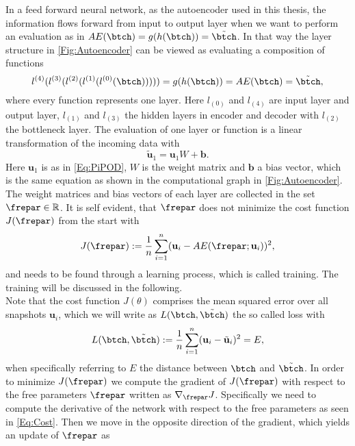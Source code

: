 In a feed forward neural network, as the autoencoder used in this thesis, the information flows forward from input to output layer when we want to perform an evaluation as in \(AE(\btch) = g(h(\btch)) =\tilde{\btch }\). In that way the layer structure in \cref{Fig:Autoencoder} can be viewed as evaluating a composition of functions
\begin{equation}
	l^{(4)}(l^{(3)}(l^{(2)}(l^{(1)}(l^{(0)}(\btch))))) = g(h(\btch)) = AE(\btch) = \tilde{\btch}\mathrm{,}
	\label{Eq:Composition}
\end{equation}
where every function represents one layer. Here \(l_{(0)}\) and \(l_{(4)}\) are input layer and output layer, \(l_{(1)}\) and \(l_{(3)}\) the hidden layers in encoder and decoder with \(l_{(2)}\) the bottleneck layer. The evaluation of one layer or function is a linear transformation of the incoming data with
\begin{equation}
\tilde{\mathbf{u}}_1 = \mathbf{u}_1W + \mathbf{b}\mathrm{.} \label{Eq. Linear Transformation}
\end{equation}
Here \(\mathbf{u}_1\) is as in \cref{Eq:PiPOD}, \(W\) is the weight matrix and \(\mathbf{b}\) a bias vector, which is the same equation as shown in the computational graph in \cref{Fig:Autoencoder}. The weight matrices and bias vectors of each layer are collected in the set \(\frepar \in \mathbb{R}\).  It is self evident, that \(\frepar\) does not minimize the cost function \(J(\frepar)\) from the start with
\begin{equation}
	J(\frepar) := \frac{1}{n}\sum_{i=1}^n (\mathbf{u}_i - AE(\frepar;\mathbf{u}_i))^2\mathrm{,}
	\label{Eq:Cost}
\end{equation}
and needs to be found through a learning process, which is called training. The training will be discussed in the following.\\
Note that the cost function \(J(\theta)\) comprises the mean squared error over all snapshots \(\mathbf{u}_i\), which we will write as \(L(\btch,\tilde{\btch})\) the so called loss with
\begin{equation}
	L(\btch,\tilde{\btch}) := \frac{1}{n}\sum_{i=1}^n(\mathbf{u}_i - \tilde{\mathbf{u}}_i)^2 = E \mathrm{,}
\end{equation}
when specifically referring to \(E\) the distance between \(\btch\) and $\tilde{\btch}$. In order to minimize \(J(\frepar)\) we compute the gradient of \(J(\frepar)\) with respect to the free parameters \(\frepar\) written as \(\nabla_{\frepar}J\). Specifically we need to compute the derivative of the network with respect to the free parameters as seen in \cref{Eq:Cost}. Then we move in the opposite direction of the gradient, which yields an update of \(\frepar\) as
